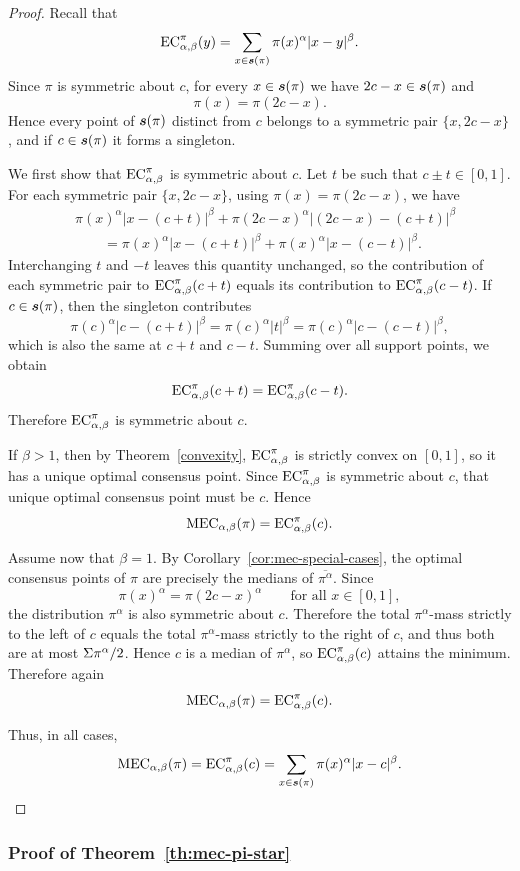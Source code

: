 \symmetryMec*
\begin{proof}
Recall that
\[
\EC(y)=\sum_{x\in\support(\pi)} \pi(x)^\alpha |x-y|^\beta.
\]
Since $\pi$ is symmetric about $c$, for every $x\in\boldsymbol{s}(\pi)$ we have
$2c-x\in\boldsymbol{s}(\pi)$ and
\[
\pi(x)=\pi(2c-x).
\]
Hence every point of $\boldsymbol{s}(\pi)$ distinct from $c$ belongs to a symmetric
pair $\{x,2c-x\}$, and if $c\in\boldsymbol{s}(\pi)$ it forms a singleton.

We first show that $\EC$ is symmetric about $c$. Let $t$ be such that
$c\pm t\in[0,1]$. For each symmetric pair $\{x,2c-x\}$, using
$\pi(x)=\pi(2c-x)$, we have
\[
\begin{aligned}
&\pi(x)^\alpha |x-(c+t)|^\beta
+\pi(2c-x)^\alpha |(2c-x)-(c+t)|^\beta \\
&\qquad
=\pi(x)^\alpha |x-(c+t)|^\beta
+\pi(x)^\alpha |x-(c-t)|^\beta .
\end{aligned}
\]
Interchanging $t$ and $-t$ leaves this quantity unchanged, so the
contribution of each symmetric pair to $\EC(c+t)$ equals its contribution
to $\EC(c-t)$. If $c\in\boldsymbol{s}(\pi)$, then the singleton contributes
\[
\pi(c)^\alpha |c-(c+t)|^\beta
=
\pi(c)^\alpha |t|^\beta
=
\pi(c)^\alpha |c-(c-t)|^\beta,
\]
which is also the same at $c+t$ and $c-t$. Summing over all support points,
we obtain
\[
\EC(c+t)=\EC(c-t).
\]
Therefore $\EC$ is symmetric about $c$.

If $\beta>1$, then by Theorem~\ref{convexity}, $\EC$ is strictly convex on
$[0,1]$, so it has a unique optimal consensus point. Since $\EC$ is symmetric about $c$,
that unique optimal consensus point must be $c$. Hence
\[
\MEC[\alpha,\beta](\pi)=\EC(c).
\]

Assume now that $\beta=1$. By Corollary~\ref{cor:mec-special-cases}, the
optimal consensus points of $\pi$ are precisely the medians of $\overline{\pi^\alpha}$. Since
\[
\pi(x)^\alpha=\pi(2c-x)^\alpha
\qquad\text{for all }x\in[0,1],
\]
the distribution $\pi^\alpha$ is also symmetric about $c$. Therefore the
total $\pi^\alpha$-mass strictly to the left of $c$ equals the total
$\pi^\alpha$-mass strictly to the right of $c$, and thus both are at most
$\Sigma \pi^\alpha/2$. Hence $c$ is a median of $\pi^\alpha$, so $\EC(c)$
attains the minimum. Therefore again
\[
\MEC[\alpha,\beta](\pi)=\EC(c).
\]

Thus, in all cases,
\[
\MEC[\alpha,\beta](\pi)
=
\EC(c)
=
\sum_{x\in\support(\pi)} \pi(x)^\alpha |x-c|^\beta.
\]
\end{proof}

\subsubsection{Proof of Theorem~\ref{th:mec-pi-star}}
\label{appendix:proof-mec-pi-star}

